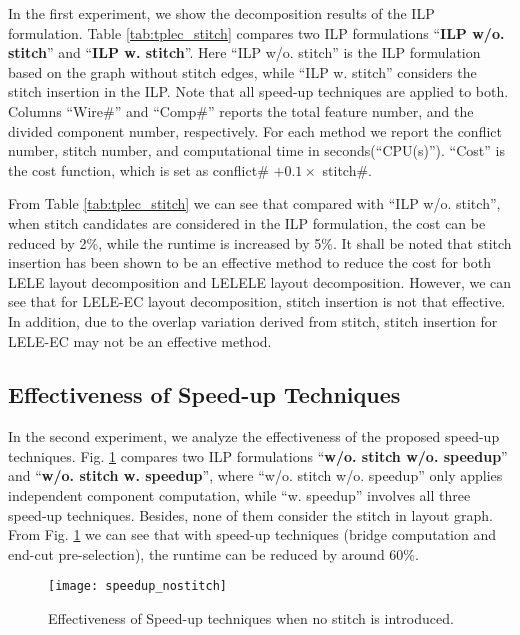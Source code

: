 \documentclass[12pt]{spieman}
\theoremstyle{plain}
\begin{document}
\begin{spacing}{1}
\begin{table*}[htb]
{\begin{tabular}{|c|c|c |c|c|c|c||c|c|c|c||}
 \hline \hline
\end{tabular}
}
\end{table*}


In the first experiment, we show the decomposition results of the ILP formulation.
Table \ref{tab:tplec_stitch} compares two ILP formulations ``\textbf{ILP w/o. stitch}'' and ``\textbf{ILP w. stitch}''.
Here ``ILP w/o. stitch'' is the ILP formulation based on the graph without stitch edges, while ``ILP w. stitch'' considers the stitch insertion in the ILP.
Note that all speed-up techniques are applied to both.
Columns ``Wire\#'' and ``Comp\#'' reports the total feature number, and the divided component number, respectively.
For each method we report the conflict number, stitch number, and computational time in seconds(``CPU(s)'').
``Cost'' is the cost function, which is set as conflict\# $+ 0.1 \times $ stitch\#.

From Table \ref{tab:tplec_stitch} we can see that
compared with ``ILP w/o. stitch'', when stitch candidates are considered in the ILP formulation, the cost can be reduced by 2\%, while the runtime is increased by 5\%.
It shall be noted that stitch insertion has been shown to be an effective method to reduce the cost for both LELE layout decomposition and LELELE layout decomposition.
However, we can see that for LELE-EC layout decomposition, stitch insertion is not that effective.
In addition, due to the overlap variation derived from stitch, stitch insertion for LELE-EC may not be an effective method.

\subsection{Effectiveness of Speed-up Techniques}

In the second experiment, we analyze the effectiveness of the proposed speed-up techniques.
Fig. \ref{fig:tplec_speedup_nostitch} compares two ILP formulations ``\textbf{w/o. stitch w/o. speedup}'' and ``\textbf{w/o. stitch w. speedup}'',
where ``w/o. stitch w/o. speedup'' only applies independent component computation, while ``w. speedup'' involves all three speed-up techniques.
Besides, none of them consider the stitch in layout graph.
From Fig. \ref{fig:tplec_speedup_nostitch} we can see that with speed-up techniques (bridge computation and end-cut pre-selection), the runtime can be reduced by around 60\%.

\begin{figure}[htb]
  \centering
  \texttt{[image: speedup\_nostitch]}
  \caption{Effectiveness of Speed-up techniques when no stitch is introduced.}
  \label{fig:tplec_speedup_nostitch}
\end{figure}


\end{spacing}
\end{document}
